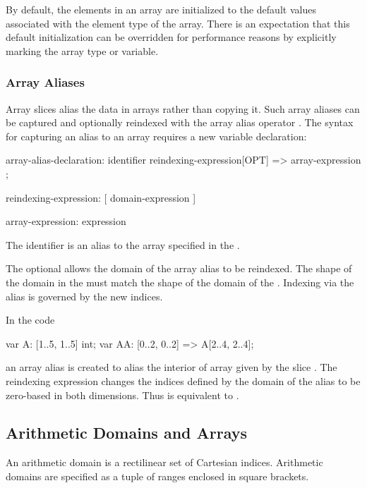 By default, the elements in an array are initialized to the default
values associated with the element type of the array.  There is an
expectation that this default initialization can be overridden for
performance reasons by explicitly marking the array type or variable.

\subsubsection{Array Aliases}
\label{Array_Aliases}

Array slices alias the data in arrays rather than copying it.  Such
array aliases can be captured and optionally reindexed with the array
alias operator \chpl{=>}.  The syntax for capturing an alias to an
array requires a new variable declaration:
\begin{syntax}
array-alias-declaration:
  identifier reindexing-expression[OPT] => array-expression ;

reindexing-expression:
  [ domain-expression ]

array-expression:
  expression
\end{syntax}
The identifier is an alias to the array specified in
the .

The optional  allows the domain of the
array alias to be reindexed.  The shape of the domain in
the  must match the shape of the domain of
the .  Indexing via the alias is governed by
the new indices.

\begin{example}
In the code
\begin{chapel}
var A: [1..5, 1..5] int;
var AA: [0..2, 0..2] => A[2..4, 2..4];
\end{chapel}
an array alias  is created to alias the interior of
array  given by the slice .  The
reindexing expression changes the indices defined by the domain of the
alias to be zero-based in both dimensions.  Thus  is
equivalent to .
\end{example}

\subsection{Arithmetic Domains and Arrays}
\label{Arithmetic_Domains_and_Arrays}

An arithmetic domain is a rectilinear set of Cartesian indices.
Arithmetic domains are specified as a tuple of ranges enclosed in
square brackets.

